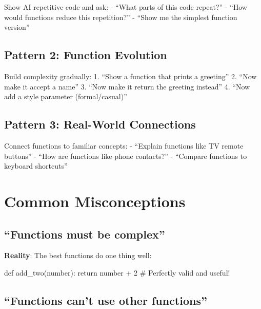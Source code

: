 \documentclass[
  letterpaper,
  DIV=11,
  numbers=noendperiod,
  oneside]{scrreprt}
\newenvironment{Shaded}{}{}
\newcommand{\CommentTok}[1]{\textcolor[rgb]{0.42,0.45,0.49}{#1}}
\newcommand{\ControlFlowTok}[1]{\textcolor[rgb]{0.84,0.23,0.29}{#1}}
\newcommand{\DecValTok}[1]{\textcolor[rgb]{0.00,0.36,0.77}{#1}}
\newcommand{\KeywordTok}[1]{\textcolor[rgb]{0.84,0.23,0.29}{#1}}
\newcommand{\NormalTok}[1]{\textcolor[rgb]{0.14,0.16,0.18}{#1}}
\newcommand{\OperatorTok}[1]{\textcolor[rgb]{0.14,0.16,0.18}{#1}}
\begin{document}
Show AI repetitive code and ask: - ``What parts of this code repeat?'' -
``How would functions reduce this repetition?'' - ``Show me the simplest
function version''

\subsection{Pattern 2: Function
Evolution}\label{pattern-2-function-evolution}

Build complexity gradually: 1. ``Show a function that prints a
greeting'' 2. ``Now make it accept a name'' 3. ``Now make it return the
greeting instead'' 4. ``Now add a style parameter (formal/casual)''

\subsection{Pattern 3: Real-World
Connections}\label{pattern-3-real-world-connections}

Connect functions to familiar concepts: - ``Explain functions like TV
remote buttons'' - ``How are functions like phone contacts?'' -
``Compare functions to keyboard shortcuts''

\section{Common Misconceptions}\label{common-misconceptions-5}

\subsection{``Functions must be
complex''}\label{functions-must-be-complex}

\textbf{Reality}: The best functions do one thing well:

\begin{Shaded}
\begin{Highlighting}[]
\KeywordTok{def}\NormalTok{ add\_two(number):}
    \ControlFlowTok{return}\NormalTok{ number }\OperatorTok{+} \DecValTok{2}
\CommentTok{\# Perfectly valid and useful!}
\end{Highlighting}
\end{Shaded}

\subsection{``Functions can't use other
functions''}\label{functions-cant-use-other-functions}
\end{document}
